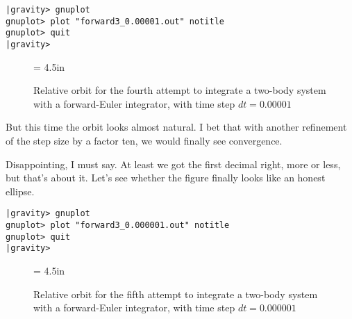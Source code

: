 \cba

\begin{small}
\begin{verbatim}
|gravity> gnuplot
gnuplot> plot "forward3_0.00001.out" notitle
gnuplot> quit
|gravity> 
\end{verbatim}
\end{small}

\begin{figure}[ht]
\begin{center}
\epsfxsize = 4.5in
\caption[Two-body orbit with a forward-Euler integrator, time step
$dt = 0.00001$]
{Relative orbit for the fourth attempt to integrate a two-body system with a
forward-Euler integrator, with time step $dt = 0.00001$}
\label{fig:forward3-0.00001}
\end{center}
\end{figure}

\abc

\carol
But this time the orbit looks almost natural.  I bet that with another
refinement of the step size by a factor ten, we would finally see
convergence.

\cba


\abc

\bob
Disappointing, I must say.  At least we got the first decimal right,
more or less, but that's about it.  Let's see whether the figure
finally looks like an honest ellipse.

\cba

\begin{small}
\begin{verbatim}
|gravity> gnuplot
gnuplot> plot "forward3_0.000001.out" notitle
gnuplot> quit
|gravity> 
\end{verbatim}
\end{small}

\begin{figure}[ht]
\begin{center}
\epsfxsize = 4.5in
\caption[Two-body orbit with a forward-Euler integrator, time step
$dt = 0.000001$]
{Relative orbit for the fifth attempt to integrate a two-body system with a
forward-Euler integrator, with time step $dt = 0.000001$}
\label{fig:forward3-0.000001}
\end{center}
\end{figure}

